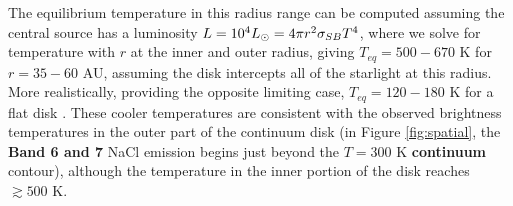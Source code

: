 \documentclass[twocolumn]{aastex62}
\newcommand{\referee}[1]{\textbf{#1}}
\begin{document}
The equilibrium temperature in this radius range can be computed assuming the central
source has a luminosity $L=10^4 L_{\odot} = 4 \pi r^2 \sigma_{SB} T^4 $, where we
solve for temperature with $r$ at the inner and outer radius, giving $T_{eq} =
500-670$ K for $r=35-60$ AU, assuming the disk intercepts all of the starlight
at this radius.  More realistically, providing the opposite limiting case,
$T_{eq}=120-180$ K for a flat disk \citep[Eqn. 4 of][]{Chiang1997a}.  These
cooler temperatures are consistent with the observed brightness temperatures in
the outer part of the continuum disk (in Figure \ref{fig:spatial}, the \referee{Band 6
and 7} NaCl emission begins just beyond the $T=300$ K \referee{continuum}
contour), although the temperature in the inner portion of the disk reaches
$\gtrsim500$ K.
\end{document}
